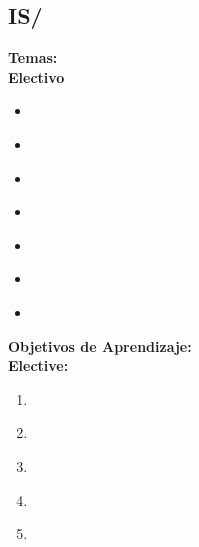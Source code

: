 \subsection{IS/\ISAgents}\label{sec:BOK:ISAgents}
\noindent \textbf{Temas:}\\
\noindent \textbf{Electivo}
\begin{itemize}
	\item \ISAgentsTopicDefinitions\label{sec:BOK:ISAgentsTopicDefinitions}
	\item \ISAgentsTopicAgent\label{sec:BOK:ISAgentsTopicAgent}
	\item \ISAgentsTopicAgentTheory\label{sec:BOK:ISAgentsTopicAgentTheory}
	\item \ISAgentsTopicRationality\label{sec:BOK:ISAgentsTopicRationality}
	\item \ISAgentsTopicSoftware\label{sec:BOK:ISAgentsTopicSoftware}
	\item \ISAgentsTopicLearning\label{sec:BOK:ISAgentsTopicLearning}
	\item \ISAgentsTopicMulti\label{sec:BOK:ISAgentsTopicMulti}
\end{itemize}


\noindent \textbf{Objetivos de Aprendizaje:}\\
\noindent \textbf{Elective:}
\begin{enumerate}
	\setcounter{enumi}{0}
	\item \ISAgentsLOListTheOf\xspace[\ISAgentsLOListTheOfLevel]\label{sec:BOK:ISAgentsLOListTheOf}
	\item \ISAgentsLOCharacterizeAnd\xspace[\ISAgentsLOCharacterizeAndLevel]\label{sec:BOK:ISAgentsLOCharacterizeAnd}
	\item \ISAgentsLODescribeTheAgent\xspace[\ISAgentsLODescribeTheAgentLevel]\label{sec:BOK:ISAgentsLODescribeTheAgent}
	\item \ISAgentsLODescribeTheUsed\xspace[\ISAgentsLODescribeTheUsedLevel]\label{sec:BOK:ISAgentsLODescribeTheUsed}
	\item \ISAgentsLODemonstrateUsingHow\xspace[\ISAgentsLODemonstrateUsingHowLevel]\label{sec:BOK:ISAgentsLODemonstrateUsingHow}
\end{enumerate}


